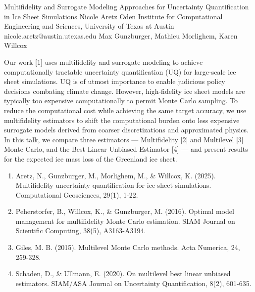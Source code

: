 \begin{talk}
\end{talk}

\begin{talk}
  {Multifidelity and Surrogate Modeling Approaches for Uncertainty Quantification in Ice Sheet Simulations}%
  {Nicole Aretz}%
  {Oden Institute for Computational Engineering and Sciences, University of Texas at Austin}%
  {nicole.aretz@austin.utexas.edu}%
  {Max Gunzburger, Mathieu Morlighem, Karen Willcox}%
  
    
   
Our work [1] uses multifidelity and surrogate modeling to achieve computationally tractable uncertainty quantification (UQ) for large-scale ice sheet simulations. UQ is of utmost importance to enable judicious policy decisions combating climate change. However, high-fidelity ice sheet models are typically too expensive computationally to permit Monte Carlo sampling. To reduce the computational cost while achieving the same target accuracy, we use multifidelity estimators to shift the computational burden onto less expensive surrogate models derived from coarser discretizations and approximated physics. In this talk, we compare three estimators — Multifidelity [2] and Multilevel [3] Monte Carlo, and the Best Linear Unbiased Estimator [4] — and present results for the expected ice mass loss of the Greenland ice sheet.

\medskip

\begin{enumerate}
 \item[{[1]}] Aretz, N., Gunzburger, M., Morlighem, M., \& Willcox, K. (2025). Multifidelity uncertainty quantification for ice sheet simulations. Computational Geosciences, 29(1), 1-22.
 \item[{[2]}] Peherstorfer, B., Willcox, K., \& Gunzburger, M. (2016). Optimal model management for multifidelity Monte Carlo estimation. SIAM Journal on Scientific Computing, 38(5), A3163-A3194.
    \item[{[3]}] Giles, M. B. (2015). Multilevel Monte Carlo methods. Acta Numerica, 24, 259-328.
    \item[{[4]}] Schaden, D., \& Ullmann, E. (2020). On multilevel best linear unbiased estimators. SIAM/ASA Journal on Uncertainty Quantification, 8(2), 601-635.
\end{enumerate}

\end{talk}
